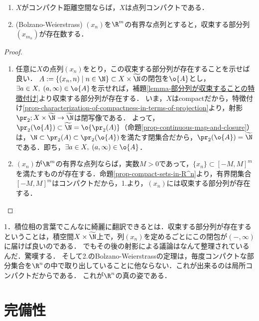 \documentclass[uplatex,dvipdfmx]{jsreport}
\newcommand{\wN}{\widetilde{\N}}
\begin{document}
\begin{proposition}[コンパクト距離空間は点列コンパクトである]\mbox{}\label{prop-Bolzano-Weierstrass}
    \begin{enumerate}
        \item $X$がコンパクト距離空間ならば，$X$は点列コンパクトである．
        \item (Bolzano-Weierstrass) $(x_n)$を$\R^m$の有界な点列とすると，収束する部分列$(x_{m_n})$が存在数する．
    \end{enumerate}
\end{proposition}
\begin{proof}\mbox{}
    \begin{enumerate}
        \item 任意に$X$の点列$(x_n)$をとり，この収束する部分列が存在することを示せば良い．
        $A:=\{(x_n,n)\mid n\in\N\}\subset X\times\wN$の閉包を$\o{A}$とし，$\exists a\in X,\;(a,\infty)\in\o{A}$を示せれば，補題\ref{lemma-部分列が収束することの特徴付け}より収束する部分列が存在する．
        いま，$X$はcompactだから，特徴付け\ref{prop-characterization-of-compactness-in-terms-of-projection}より，射影$\pr_2;X\times\wN\to\wN$は閉写像である．
        よって，$\pr_2(\o{A})\subset\wN=\o{\pr_2(A)}$（命題\ref{prop-continuous-map-and-closure}）は，$\N\subset\pr_2(A)\subset\pr_2(\o{A})$を満たす閉集合だから，$\pr_2(\o{A})=\wN$である．即ち，$\exists a\in X,\;(a,\infty)\in\o{A}$．
        \item 
        $(x_n)$が$\R^m$の有界な点列ならば，実数$M>0$であって，$\{x_n\}\subset[-M,M]^m$を満たすものが存在する．命題\ref{prop-compact-sets-in-R^n}より，有界閉集合$[-M,M]^m$はコンパクトだから，1.より，$(x_n)$には収束する部分列が存在する．
    \end{enumerate}
\end{proof}
\begin{remarks}
    1．積位相の言葉でこんなに綺麗に翻訳できるとは．収束する部分列が存在するということは，積空間$X\times\wN$上で，列$(x_n)$を定めるごとにこの閉包が$(-,\infty)$に届けば良いのである．
    でもその後の射影による議論はなんて整理されているんだ．驚嘆する．
    そして2.のBolzano-Weierstrassの定理は，毎度コンパクトな部分集合を$\R^n$の中で取り出していることに他ならない．これが出来るのは局所コンパクトだからである．
    これが$\R^n$の真の姿である．
\end{remarks}

\section{完備性}
\end{document}
